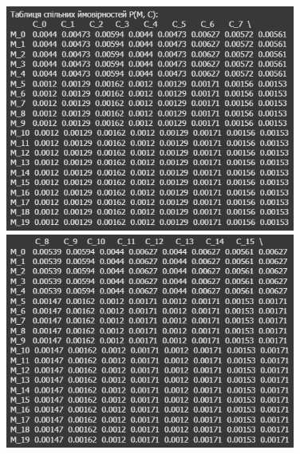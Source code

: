 \begin{figure}[!ht]
    \centering
    \begin{minipage}{0.35\linewidth}
        \includegraphics[width=0.85\textwidth]{ReportPic/report_2.1.png}
    \end{minipage}
    \begin{minipage}{0.35\linewidth}
        \includegraphics[width=0.85\textwidth]{ReportPic/report_2.2.png}
    \end{minipage}
    \begin{minipage}{0.25\linewidth}

\end{minipage}
\end{figure}
